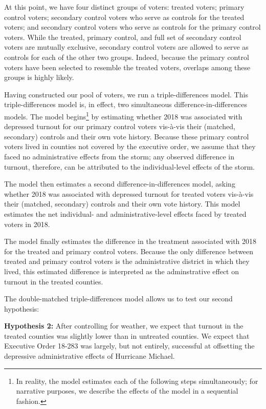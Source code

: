 \documentclass[
  12pt,
]{article}
\begin{document}
At this point, we have four distinct groups of voters: treated voters; primary control voters; secondary control voters who serve as controls for the treated voters; and secondary control voters who serve as controls for the primary control voters. While the treated, primary control, and full set of secondary control voters are mutually exclusive, secondary control voters are allowed to serve as controls for each of the other two groups. Indeed, because the primary control voters have been selected to resemble the treated voters, overlaps among these groups is highly likely.

Having constructed our pool of voters, we run a triple-differences model. This triple-differences model is, in effect, two simultaneous difference-in-differences models. The model begins\footnote{In reality, the model estimates each of the following steps simultaneously; for narrative purposes, we describe the effects of the model in a sequential fashion.} by estimating whether 2018 was associated with depressed turnout for our primary control voters vis-à-vis their (matched, secondary) controls and their own vote history. Because these primary control voters lived in counties not covered by the executive order, we assume that they faced no administrative effects from the storm; any observed difference in turnout, therefore, can be attributed to the individual-level effects of the storm.

The model then estimates a second difference-in-differences model, asking whether 2018 was associated with depressed turnout for treated voters vis-à-vis their (matched, secondary) controls and their own vote history. This model estimates the net individual- and administrative-level effects faced by treated voters in 2018.

The model finally estimates the difference in the treatment associated with 2018 for the treated and primary control voters. Because the only difference between treated and primary control voters is the administrative district in which they lived, this estimated difference is interpreted as the adminstrative effect on turnout in the treated counties.

The double-matched triple-differences model allows us to test our second hypothesis:

\textbf{Hypothesis 2:} After controlling for weather, we expect that turnout in the treated counties was slightly lower than in untreated counties. We expect that Executive Order 18-283 was largely, but not entirely, successful at offsetting the depressive administrative effects of Hurricane Michael.
\end{document}
